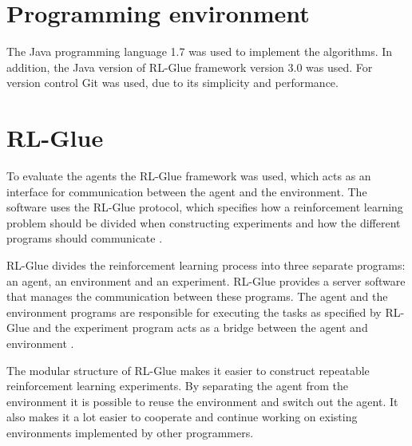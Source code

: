 \section{Programming environment}
\label{sec:prog_env}

The Java programming language 1.7 was used to implement the algorithms. In addition, the
Java version of RL-Glue framework version 3.0 was used. For version control Git
was used, due to its simplicity and performance.

\section{RL-Glue}
\label{sec:rl_glue}

To evaluate the agents the RL-Glue framework was used, which acts as an
interface for communication between the agent and the environment. The software
uses the RL-Glue protocol, which specifies how a reinforcement learning problem
should be divided when constructing experiments and how the different programs
should communicate \parencite{tanner2009rl}.

RL-Glue divides the reinforcement learning process into three separate
programs: an agent, an environment and an experiment. RL-Glue provides a server
software that manages the communication between these programs. The agent and
the environment programs are responsible for executing the tasks as specified
by RL-Glue and the experiment program acts as a bridge between the agent and
environment \parencite{tanner2009rl}.

The modular structure of RL-Glue makes it easier to construct repeatable
reinforcement learning experiments. By separating the agent from the
environment it is possible to reuse the environment and switch out the agent.
It also makes it a lot easier to cooperate and continue working on existing
environments implemented by other programmers.
